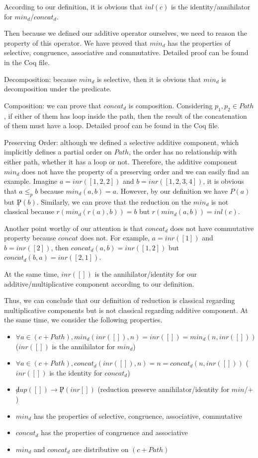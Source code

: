 \documentclass[a4paper,12pt,twoside,openright]{report}
\begin{document}
According to our definition, it is obvious that $inl(c)$ is the identity/annihilator for $min_d$/$concat_d$.

Then because we defined our additive operator ourselves, we need to reason the property of this operator. We have proved that $min_d$ has the properties of selective, congruence, associative and commutative. Detailed proof can be found in the Coq file.

Decomposition: because $min_d$ is selective, then it is obvious that $min_d$ is decomposition under the predicate.

Composition: we can prove that $concat_d$ is composition. Considering $p_1,p_2 \in Path$, if either of them has loop inside the path, then the result of the concatenation of them must have a loop. Detailed proof can be found in the Coq file.

Preserving Order: although we defined a selective additive component, which implicitly defines a partial order on $Path$, the order has no relationship with either path, whether it has a loop or not.  Therefore, the additive component $min_d$ does not have the property of a preserving order and we can easily find an example. Imagine $a = inr([1,2,2])$ and $b = inr([1,2,3,4])$, it is obvious that $a \leq_p b$ because $min_d(a,b) = a$. However, by our definition we have $P(a)$ but $\not P(b)$. Similarly, we can prove that the reduction on the $min_d$ is not classical because $r(min_d(r(a),b)) = b$ but $r(min_d(a,b)) = inl(c)$.



Another point worthy of our attention is that $concat_d$ does not have commutative property because $concat$ does not. For example, $a = inr([1])$ and $b = inr([2])$, then $concat_d(a,b) = inr([1,2])$ but $concat_d(b,a) = inr([2,1])$.

At the same time, $inr([])$ is the annihilator/identity for our additive/multiplicative component according to our definition.

Thus, we can conclude that our definition of reduction is classical regarding multiplicative components but is not classical regarding additive component.  At the same time, we consider the following properties.
\begin{itemize}
  \item $\forall a \in (c + Path), min_d(inr([]),n) = inr([]) = min_d(n,inr([]))$ ($inr([])$ is the annihilator for $min_d$)
  \item $\forall a \in (c + Path), concat_d(inr([]),n) = n = concat_d(n,inr([]))$ ($inr([])$ is the identity for $concat_d$)
  \item $ \not dup([]) \rightarrow \not P(inr[])$ (reduction preserve annihilator/identity for $min$/$+$)
  \item $min_d$ has the properties of selective, congruence, associative, commutative
  \item $concat_d$ has the properties of congruence and associative
  \item $min_d$ and $concat_d$ are distributive on $(c + Path)$
\end{itemize}
\end{document}
